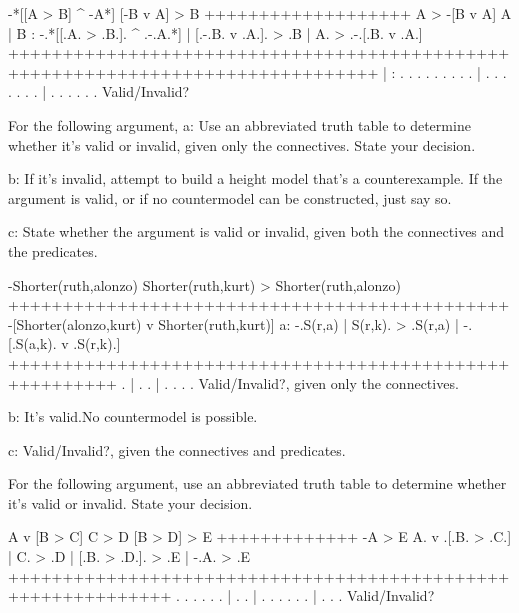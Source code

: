 \argument
 -*[[A > B] ^ -A*]
 [-B v A] > B
+++++++++++++++++++
 A > -[B v A]
\endargument
        \answer
        \truthtable
         A | B : -.*[[.A. > .B.]. ^ .-.A.*] | [.-.B. v .A.]. > .B | A. > .-.[.B. v .A.]
        ++++++++++++++++++++++++++++++++++++++++++++++++++++++++++++++++++++++++++++++++
           |   :  .   . .   . . .   . . .   |  . . .   . . .   .  |  .   . . . .   . 
        \endtruthtable
        Valid/Invalid?
        \endanswer

\endproblems

For the following argument,
\list
a: Use an abbreviated truth table to determine whether it's valid or invalid, given only the connectives. State your decision.

b: If it's invalid, attempt to build a height model that's a counterexample. If the argument is valid, or if no countermodel can be constructed, just say so.

c: State whether the argument is valid or invalid, given both the connectives and the predicates.
\endlist

\problems
{}
\argument
 -Shorter(ruth,alonzo)
 Shorter(ruth,kurt) > Shorter(ruth,alonzo)
++++++++++++++++++++++++++++++++++++++++++++++
 -[Shorter(alonzo,kurt) v Shorter(ruth,kurt)]
\endargument
        \answerlist
        a:
        \truthtable
         -.S(r,a) | S(r,k). > .S(r,a) | -.[.S(a,k). v .S(r,k).]
        ++++++++++++++++++++++++++++++++++++++++++++++++++++++++
          .       |       .   .       |  . .      .   .
        \endtruthtable
        Valid/Invalid?, given only the connectives.

        b: It's valid.\OR No countermodel is possible.\OR
        \heightmodel
         
        \endheightmodel

        c: Valid/Invalid?, given the connectives and predicates.
        \endanswerlist

\endproblems

For the following argument, use an abbreviated truth table to determine whether it's valid or invalid. State your decision.

\problems
{}
\argument
 A v [B > C]
 C > D
 [B > D] > E
+++++++++++++
 -A > E
\endargument
        \answer
        \truthtable
         A. v .[.B. > .C.] | C. > .D | [.B. > .D.]. > .E | -.A. > .E
        +++++++++++++++++++++++++++++++++++++++++++++++++++++++++++++
          .   . . .   . .  |  .   .  |  . .   . . .   .  |  . .   .
        \endtruthtable
        Valid/Invalid?
        \endanswer

\endproblems
\bye
